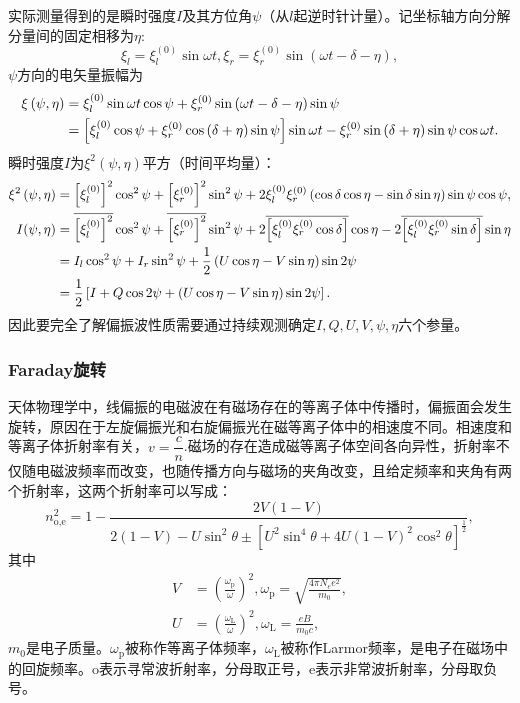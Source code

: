\documentclass[../天体物理基础.tex]{subfiles}
\begin{document}
实际测量得到的是瞬时强度$I$及其方位角$\psi$（从$l$起逆时针计量）。记坐标轴方向分解分量间的固定相移为$\eta$:
\begin{equation}
\xi_l=\xi_l^{\left(0\right)}\sin\omega t,\xi_r=\xi_r^{\left(0\right)}\sin\left(\omega t-\delta-\eta\right),
\end{equation}
$\psi$方向的电矢量振幅为
\begin{align}
\xi\left(\psi,\eta\right)&=\xi_l^{\left(0\right)}\sin\omega t\cos\psi+\xi_r^{\left(0\right)}\sin\left(\omega t-\delta-\eta\right)\sin\psi\notag\\
&=\left[\xi_l^{\left(0\right)}\cos\psi+\xi_r^{\left(0\right)}\cos\left(\delta+\eta\right)\sin\psi\right]\sin\omega t-\xi_r^{\left(0\right)}\sin\left(\delta+\eta\right)\sin\psi\cos\omega t.
\end{align}
瞬时强度$I$为$\xi^{2}\left(\psi,\eta\right)$平方（时间平均量）：
\begin{align}
\xi^2\left(\psi,\eta\right)&=\left[\xi_l^{\left(0\right)}\right]^2\cos^2\psi+\left[\xi_r^{\left(0\right)}\right]^2\sin^2\psi+2\xi_l^{\left(0\right)}\xi_r^{\left(0\right)}\left(\cos\delta\cos\eta-\sin\delta\sin\eta\right)\sin\psi\cos\psi,\\
I(\psi,\eta)&=\overline{\left[\xi_l^{\left(0\right)}\right]^2}\cos^2\psi+\overline{\left[\xi_r^{\left(0\right)}\right]^2}\sin^2\psi+2\overline{\left[\xi_l^{\left(0\right)}\xi_r^{\left(0\right)}\cos\delta\right]}\cos\eta-2\overline{\left[\xi_l^{\left(0\right)}\xi_r^{\left(0\right)}\sin\delta\right]}\sin\eta\notag\\
&=I_l\cos^2\psi+I_r\sin^2\psi+\frac12\left(U\cos\eta-V\sin\eta\right)\sin2\psi\notag\\
&=\frac12\left[I+Q\cos2\psi+\left(U\cos\eta-V\sin\eta\right)\sin2\psi\right].
\end{align}
因此要完全了解偏振波性质需要通过持续观测确定$I,Q,U,V,\psi,\eta$六个参量。

\subsubsection{Faraday旋转}
天体物理学中，线偏振的电磁波在有磁场存在的等离子体中传播时，偏振面会发生旋转，原因在于左旋偏振光和右旋偏振光在磁等离子体中的相速度不同。相速度和等离子体折射率有关，$v=\dfrac{c}{n}$.磁场的存在造成磁等离子体空间各向异性，折射率不仅随电磁波频率而改变，也随传播方向与磁场的夹角改变，且给定频率和夹角有两个折射率，这两个折射率可以写成：
\begin{equation}
n^{2}_{\text{o,e}}=1-\frac{2V\left(1-V\right)}{2\left(1-V\right)-U\sin^{2}\theta\pm\left[U^{2}\sin^{4}\theta+4U\left(1-V\right)^{2}\cos^{2}\theta\right]^{\frac{1}{2}}},
\end{equation}
其中
\begin{align}
V&=\left(\frac{\omega_{\text{p}}}{\omega}\right)^{2},\omega_{\text{p}}=\sqrt{\frac{4\pi N_{e}e^{2}}{m_{0}}},\\
U&=\left(\frac{\omega_{\text{L}}}{\omega}\right)^{2},\omega_{\text{L}}=\frac{eB}{m_{0}c},
\end{align}
$m_{0}$是电子质量。$\omega_{\text{p}}$被称作等离子体频率，$\omega_{\text{L}}$被称作Larmor频率，是电子在磁场中的回旋频率。$\text{o}$表示寻常波折射率，分母取正号，$\text{e}$表示非常波折射率，分母取负号。
\end{document}
